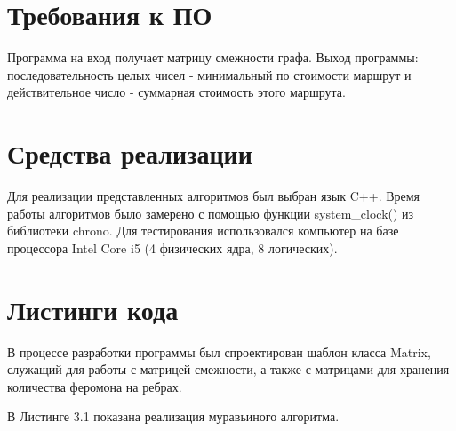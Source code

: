 \documentclass[a4paper,12pt]{report}
\begin{document}
\section{Требования к ПО}

\hspace{0.6cm}Программа на вход получает матрицу смежности графа. Выход  программы: последовательность целых чисел - минимальный по стоимости маршрут и действительное число - суммарная стоимость этого маршрута.
	
\section{Средства реализации}
\hspace{0.6cm}Для реализации представленных алгоритмов был выбран язык C++. Время работы алгоритмов было замерено с помощью функции system\_clock() из библиотеки chrono. Для тестирования использовался компьютер на базе процессора Intel Core i5 (4 физических ядра, 8 логических).

\section{Листинги кода}

\hspace{0.6cm}В процессе разработки программы был спроектирован шаблон класса Matrix,  служащий для работы с матрицей смежности, а также с матрицами для хранения количества феромона на ребрах.

В Листинге 3.1 показана реализация муравьиного алгоритма.
\end{document}
